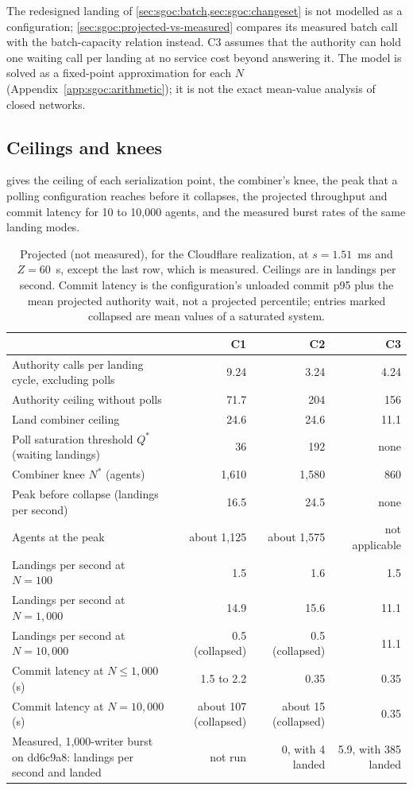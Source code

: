 \documentclass[11pt,letterpaper]{article}
\theoremstyle{definition}
\theoremstyle{remark}
\begin{document}
The redesigned landing of \cref{sec:sgoc:batch,sec:sgoc:changeset} is not modelled as a configuration; \cref{sec:sgoc:projected-vs-measured} compares its measured batch call with the batch-capacity relation instead. C3 assumes that the authority can hold one waiting call per landing at no service cost beyond answering it. The model is solved as a fixed-point approximation for each $N$ (Appendix~\ref{app:sgoc:arithmetic}); it is not the exact mean-value analysis of closed networks.

\subsection{Ceilings and knees}

 gives the ceiling of each serialization point, the combiner's knee, the peak that a polling configuration reaches before it collapses, the projected throughput and commit latency for 10 to 10,000 agents, and the measured burst rates of the same landing modes.

\begin{table}[t]
\centering
\caption{Projected (not measured), for the Cloudflare realization, at $s = 1.51$~ms and $Z = 60$~s, except the last row, which is measured. Ceilings are in landings per second. Commit latency is the configuration's unloaded commit p95 plus the mean projected authority wait, not a projected percentile; entries marked collapsed are mean values of a saturated system.}
\label{tab:sgoc:projected}
\small
\begin{tabularx}{\textwidth}{@{}Yrrr@{}}
\toprule
 & C1 & C2 & C3 \\
\midrule
Authority calls per landing cycle, excluding polls & 9.24 & 3.24 & 4.24 \\
Authority ceiling without polls & 71.7 & 204 & 156 \\
Land combiner ceiling & 24.6 & 24.6 & 11.1 \\
Poll saturation threshold $Q^{*}$ (waiting landings) & 36 & 192 & none \\
Combiner knee $N^{*}$ (agents) & 1,610 & 1,580 & 860 \\
Peak before collapse (landings per second) & 16.5 & 24.5 & none \\
Agents at the peak & about 1,125 & about 1,575 & not applicable \\
\midrule
Landings per second at $N = 100$ & 1.5 & 1.6 & 1.5 \\
Landings per second at $N = 1{,}000$ & 14.9 & 15.6 & 11.1 \\
Landings per second at $N = 10{,}000$ & 0.5 (collapsed) & 0.5 (collapsed) & 11.1 \\
\midrule
Commit latency at $N \le 1{,}000$ (s) & 1.5 to 2.2 & 0.35 & 0.35 \\
Commit latency at $N = 10{,}000$ (s) & about 107 (collapsed) & about 15 (collapsed) & 0.35 \\
\midrule
Measured, 1,000-writer burst on dd6c9a8: landings per second and landed & not run & 0, with 4 landed & 5.9, with 385 landed \\ %
\bottomrule
\end{tabularx}
\end{table}
\end{document}
